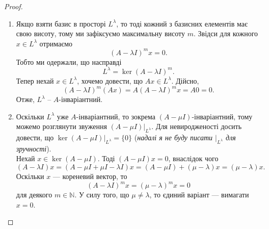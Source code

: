 \documentclass{math_library}
\begin{document}
\begin{proof}
\begin{enumerate}[topsep=0pt,wide=0pt,label={\arabic*)}]
\item Якщо взяти базис в просторі $L^\lambda$, то тоді кожний з базисних елементів має свою висоту, тому ми зафіксуємо максимальну висоту $m$. Звідси для кожного $x \in L^{\lambda}$ отримаємо
\[
(A-\lambda I)^m x = 0.
\]
Тобто ми одержали, що насправді
\[
L^\lambda = \ker (A-\lambda I)^m.
\]
Тепер нехай $x \in L^{\lambda}$, хочемо довести, що $Ax \in L^{\lambda}$. Дійсно, 
\[
(A - \lambda I)^m (Ax) = A (A-\lambda I)^m x = A0 = 0.
\]
Отже, $L^\lambda$ -- $A$-інваріантний.

\item Оскільки $L^\lambda$ уже $A$-інваріантний, то зокрема $(A-\mu I)$-інваріантний, тому можемо розглянути звуження $(A-\mu I)|_{L^\lambda}$. Для невиродженості досить довести, що $\ker (A-\mu I)|_{L^\lambda} = \{0\}$ (\textit{надалі я не буду писати $|_{L^{\lambda}}$ для зручності}).\\
Нехай $x \in \ker (A-\mu I)$. Тоді $(A-\mu I)x = 0$, внаслідок чого
\[
(A-\lambda I)x = (A-\mu I + \mu I - \lambda I)x = (A-\mu I) + (\mu -\lambda)x = (\mu-\lambda)x.
\]
Оскільки $x$ --- кореневий вектор, то 
\[
(A-\lambda I)^m x = (\mu - \lambda)^m x = 0
\]
для деякого $m \in \mathbb{N}$. У силу того, що $\mu \neq \lambda$, то єдиний варіант --- вимагати $x = 0$.

\end{enumerate}
\end{proof}
\end{document}

